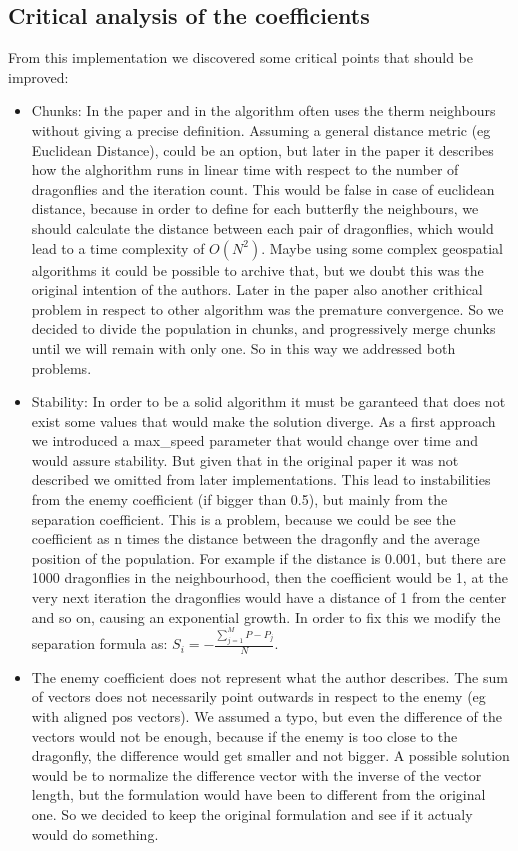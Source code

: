 \documentclass[10pt]{article}
\begin{document}
\begin{multicols}{2}
\section{Critical analysis of the coefficients}
From this implementation we discovered some critical points that should be improved:
\begin{itemize}
  \item Chunks: In the paper and in the algorithm often uses the therm neighbours without giving a precise definition.
  Assuming a general distance metric (eg Euclidean Distance), could be an option, but later in the paper it describes how the alghorithm runs in linear time with respect to the number of dragonflies and the iteration count.
  This would be false in case of euclidean distance, because in order to define for each butterfly the neighbours, we should calculate the distance between each pair of dragonflies, which would lead to a time complexity of $O(N^2)$.
  Maybe using some complex geospatial algorithms it could be possible to archive that, but we doubt this was the original intention of the authors.
  Later in the paper also another crithical problem in respect to other algorithm was the premature convergence. So we decided to divide the population in chunks, and progressively merge chunks until we will remain with only one.
  So in this way we addressed both problems.
  \item Stability: In order to be a solid algorithm it must be garanteed that does not exist some values that would make the solution diverge.
  As a first approach we introduced a max_speed parameter that would change over time and would assure stability. But given that in the original paper it was not described we omitted from later implementations.
  This lead to instabilities from the enemy coefficient (if bigger than 0.5), but mainly from the separation coefficient.
  This is a problem, because we could be see the coefficient as n times the distance between the dragonfly and the average position of the population. For example if the distance is 0.001, but there are 1000 dragonflies in the neighbourhood, then the coefficient would be 1, at the very next iteration the dragonflies would have a distance of 1 from the center and so on, causing an exponential growth.
  In order to fix this we modify the separation formula as: $S_i = - \frac{\sum^M_{j=1}{P - P_j}}{N}$.
  \item  The enemy coefficient does not represent what the author describes. The sum of vectors does not necessarily point outwards in respect to the enemy (eg with aligned pos vectors). 
  We assumed a typo, but even the difference of the vectors would not be enough, because if the enemy is too close to the dragonfly, the difference would get smaller and not bigger.
  A possible solution would be to normalize the difference vector with the inverse of the vector length, but the formulation would have been to different from the original one. So we decided to keep the original formulation and see if it actualy would do something.
  

\end{itemize}
\end{multicols}
\end{document}
